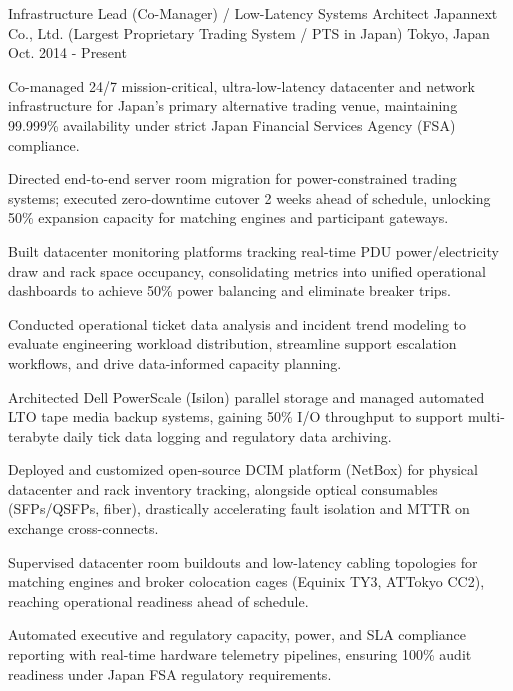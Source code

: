 

\begin{cventries}

  \cventry
    {Infrastructure Lead (Co-Manager) / Low-Latency Systems Architect} %
    {Japannext Co., Ltd. (Largest Proprietary Trading System / PTS in Japan)} %
    {Tokyo, Japan} %
    {Oct. 2014 - Present} %
    {
      \begin{cvitems} %
        \item {Co-managed 24/7 mission-critical, ultra-low-latency datacenter and network infrastructure for Japan's primary alternative trading venue, maintaining 99.999\% availability under strict Japan Financial Services Agency (FSA) compliance.}
        \item {Directed end-to-end server room migration for power-constrained trading systems; executed zero-downtime cutover 2 weeks ahead of schedule, unlocking 50\% expansion capacity for matching engines and participant gateways.}
        \item {Built datacenter monitoring platforms tracking real-time PDU power/electricity draw and rack space occupancy, consolidating metrics into unified operational dashboards to achieve 50\% power balancing and eliminate breaker trips.}
        \item {Conducted operational ticket data analysis and incident trend modeling to evaluate engineering workload distribution, streamline support escalation workflows, and drive data-informed capacity planning.}
        \item {Architected Dell PowerScale (Isilon) parallel storage and managed automated LTO tape media backup systems, gaining 50\% I/O throughput to support multi-terabyte daily tick data logging and regulatory data archiving.}
        \item {Deployed and customized open-source DCIM platform (NetBox) for physical datacenter and rack inventory tracking, alongside optical consumables (SFPs/QSFPs, fiber), drastically accelerating fault isolation and MTTR on exchange cross-connects.}
        \item {Supervised datacenter room buildouts and low-latency cabling topologies for matching engines and broker colocation cages (Equinix TY3, ATTokyo CC2), reaching operational readiness ahead of schedule.}
        \item {Automated executive and regulatory capacity, power, and SLA compliance reporting with real-time hardware telemetry pipelines, ensuring 100\% audit readiness under Japan FSA regulatory requirements.}
      \end{cvitems}
    }


\end{cventries}
